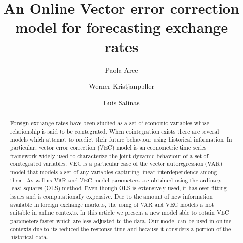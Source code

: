 \documentclass[12pt,reqno]{amsart}
\title{An Online  Vector error correction model for forecasting exchange rates}
\author[P. Arce]{Paola Arce}
\author[W. Kristjanpoller]{Werner Kristjanpoller}
\author[L. Salinas]{Luis Salinas}
\begin{document}
\maketitle

\begin{abstract}
Foreign exchange rates have been studied as a set of economic
variables whose relationship is said to be cointegrated. When
cointegration exists there are several models which attempt to predict
their future behaviour using historical information. In particular,
vector error correction (VEC) model is an econometric time series
framework widely used to characterize the joint dynamic behaviour of a
set of cointegrated variables. VEC is a particular case of the vector
autoregression (VAR) model that models a set of any variables
capturing linear interdependence among them.  As well as VAR and VEC
model parameters are obtained using the ordinary least squares (OLS)
method.  Even though OLS is extensively used, it has over-fitting
issues and is computationally expensive.  Due to the amount of new
information available in foreign exchange markets, the using of VAR
and VEC models is not suitable in online contexts.  In this article we
present a new model able to obtain VEC parameters faster which are
less adjusted to the data. Our model can be used in online contexts
due to its reduced the response time and because it considers a
portion of the historical data.
\end{abstract} 









%

%
%




\end{document}
